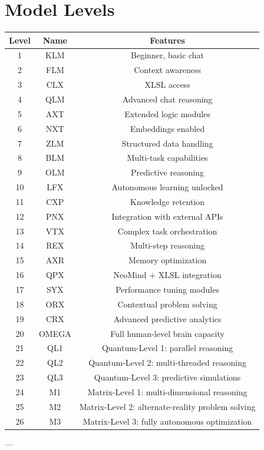 \documentclass[a4paper,12pt]{article}
\begin{document}
\section{Model Levels}
\begin{tabular}{|c|c|c|}
\hline
Level & Name & Features \\
\hline
1 & KLM & Beginner, basic chat \\
2 & FLM & Context awareness \\
3 & CLX & XLSL access \\
4 & QLM & Advanced chat reasoning \\
5 & AXT & Extended logic modules \\
6 & NXT & Embeddings enabled \\
7 & ZLM & Structured data handling \\
8 & BLM & Multi-task capabilities \\
9 & OLM & Predictive reasoning \\
10 & LFX & Autonomous learning unlocked \\
11 & CXP & Knowledge retention \\
12 & PNX & Integration with external APIs \\
13 & VTX & Complex task orchestration \\
14 & REX & Multi-step reasoning \\
15 & AXR & Memory optimization \\
16 & QPX & NeoMind + XLSL integration \\
17 & SYX & Performance tuning modules \\
18 & ORX & Contextual problem solving \\
19 & CRX & Advanced predictive analytics \\
20 & OMEGA & Full human-level brain capacity \\
21 & QL1 & Quantum-Level 1: parallel reasoning \\
22 & QL2 & Quantum-Level 2: multi-threaded reasoning \\
23 & QL3 & Quantum-Level 3: predictive simulations \\
24 & M1 & Matrix-Level 1: multi-dimensional reasoning \\
25 & M2 & Matrix-Level 2: alternate-reality problem solving \\
26 & M3 & Matrix-Level 3: fully autonomous optimization \\
\hline
\end{tabular}

---
\end{document}
